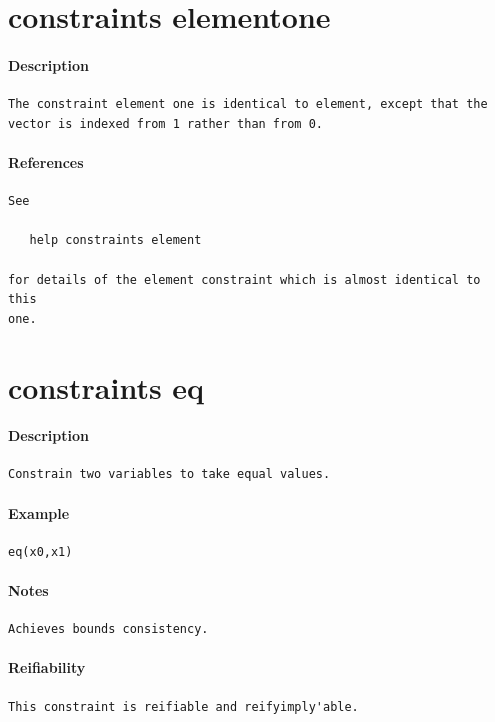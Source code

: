 \documentclass[oneside]{book}
\begin{document}
\section{constraints element\textunderscore one}
\paragraph{Description}
{\footnotesize
\begin{verbatim}
The constraint element one is identical to element, except that the
vector is indexed from 1 rather than from 0.
\end{verbatim}
}
\paragraph{References}
{\footnotesize
\begin{verbatim}
See

   help constraints element

for details of the element constraint which is almost identical to this
one.
\end{verbatim}
}
\section{constraints eq}
\paragraph{Description}
{\footnotesize
\begin{verbatim}
Constrain two variables to take equal values.
\end{verbatim}
}
\paragraph{Example}
{\footnotesize
\begin{verbatim}
eq(x0,x1)
\end{verbatim}
}
\paragraph{Notes}
{\footnotesize
\begin{verbatim}
Achieves bounds consistency.
\end{verbatim}
}
\paragraph{Reifiability}
{\footnotesize
\begin{verbatim}
This constraint is reifiable and reifyimply'able.
\end{verbatim}
}
\end{document}
